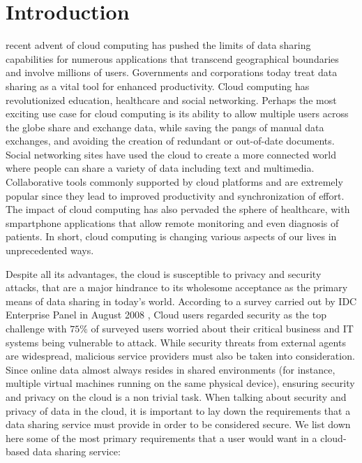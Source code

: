 \section{Introduction}
\label{sec:Intro}

 recent advent of cloud computing has pushed the limits of data sharing capabilities for numerous applications that transcend geographical boundaries and involve millions of users. Governments and corporations today treat data sharing as a vital tool for enhanced productivity. Cloud computing has revolutionized education, healthcare and social networking. Perhaps the most exciting use case for cloud computing is its ability to allow multiple users across the globe share and exchange data, while saving the pangs of manual data exchanges, and avoiding the creation of redundant or out-of-date documents. Social networking sites have used the cloud to create a more connected world where people can share a variety of data including text and multimedia. Collaborative tools commonly supported by cloud platforms and are extremely popular since they lead to improved productivity and synchronization of effort. The impact of cloud computing has also pervaded the sphere of healthcare, with smpartphone applications that allow remote monitoring and even diagnosis of patients. In short, cloud computing is changing various aspects of our lives in unprecedented ways.

Despite all its advantages, the cloud is susceptible to privacy and security attacks, that are a major hindrance to its wholesome acceptance as the primary means of data sharing in today’s world. According to a survey carried out by IDC Enterprise Panel in August 2008 \cite{panelcloud}, Cloud users regarded security as the top challenge with $75\%$ of surveyed users worried about their critical business and IT systems being vulnerable to attack. While security threats from external agents are widespread, malicious service providers must also be taken into consideration. Since online data almost always resides in shared environments (for instance, multiple virtual machines running on the same physical device), ensuring security and privacy on the cloud is a non trivial task. When talking about security and privacy of data in the cloud, it is important to lay down the requirements that a data sharing service must provide in order to be considered secure. We list down here some of the most primary requirements that a user would want in a cloud-based data sharing service:

